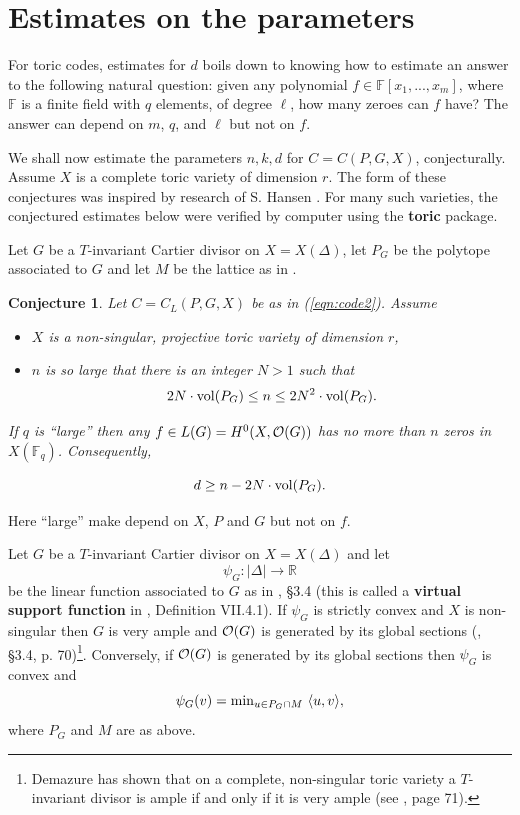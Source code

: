\documentclass[12pt]{article}
\newtheorem{conjecture}[theorem]{Conjecture}
\def\fff{\mathbb{F}}
\def\rrr{\mathbb{R}}
\begin{document}
\section{Estimates on the parameters}
\label{sec:estimate}

For toric codes, estimates for $d$ boils down to 
knowing how to estimate an answer to the following natural question:
given any polynomial $f\in \fff [x_1,...,x_m]$, where $\fff$ is
a finite field with $q$ elements, of degree $\ell$, how many zeroes
can $f$ have? The answer can depend on $m$, $q$, and $\ell$
but not on $f$.

We shall now estimate the parameters $n,k,d$ for 
$C=C(P,G,X)$, conjecturally. Assume $X$ is a complete toric
variety of dimension $r$. The form of these conjectures was
inspired by research of S. Hansen \cite{Han3}.
For many such varieties,
the conjectured estimates below were verified by computer 
using the {\bf toric} package.

Let $G$ be a $T$-invariant Cartier divisor on $X=X(\Delta)$,
let $P_G$ be the polytope associated to $G$ and let $M$ be 
the lattice as in \cite{F}.


\begin{conjecture}
\label{conj:shansen}
Let $C=C_L(P,G,X)$ be as in (\ref{eqn:code2}). Assume 
\begin{itemize}
\item
$X$ is a non-singular,
projective toric variety of dimension $r$, 
\item
$n$ is so large that there is an integer $N>1$ such that
\[
2N\cdot {\rm vol}(P_G)\leq n\leq 2N^2\cdot {\rm vol}(P_G).
\]
\end{itemize}
If $q$ is ``large'' then any 
$f\in L(G)=H^0(X,{\cal O}(G))$ has no more than $n$ zeros
in $X(\fff_q)$.
Consequently, 

\[
d\geq n- 2N\cdot {\rm vol}(P_G).
\]

\end{conjecture}

Here ``large'' make depend on $X$, $P$ and $G$ but not
on $f$.

Let $G$ be a $T$-invariant Cartier divisor on $X=X(\Delta)$
and let
\[
\psi_G:|\Delta|\rightarrow \rrr
\]
be the linear function associated to $G$ as in \cite{F},
\S 3.4 (this is called a {\bf virtual support
function} in \cite{E}, Definition VII.4.1).
If $\psi_G$ is strictly convex and $X$ is non-singular
then $G$ is very ample
and ${\cal O}(G)$ is generated by its global sections
(\cite{F}, \S 3.4, p. 70)\footnote{
Demazure has shown that on a complete, non-singular toric variety
a $T$-invariant divisor is ample if and only if it is very ample
(see \cite{F}, page 71).
}.
Conversely, if ${\cal O}(G)$ is generated by its global sections then
$\psi_G$ is convex and 
\[
\psi_G(v)={\rm min}_{u\in P_G\cap M}\ \langle u,v\rangle,
\]
where $P_G$ and $M$ are as above.
\end{document}
